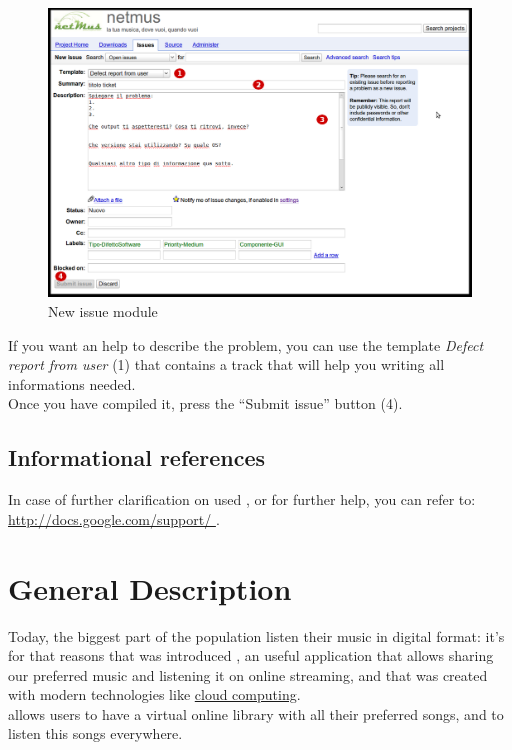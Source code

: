 \begin{figure}[!htbp]
  \centering
  \includegraphics[width=16cm]{img/MU/new_issue.png}
\caption{New issue module}
\label{fig:newIssue}
\end{figure}

If you want an help to describe the problem, you can use the template
\emph{Defect report from user} (1) that contains a track that will help you writing all 
informations needed.\\

Once you have compiled it, press the ``Submit issue'' button (4).

\section{Informational references}
In case of further clarification on used , or for further
help, you can refer to: \url{http://docs.google.com/support/
} .

\chapter{General Description}
\thispagestyle{fancy}
Today, the biggest part of the population listen their music in digital
format: it's for that reasons that was introduced , an useful
application that allows sharing our preferred music and listening it on online
streaming, and that was created with modern technologies like \underline{cloud
computing}.\\

 allows users to have a virtual online library with all their
preferred songs, and to listen this songs everywhere.\\

